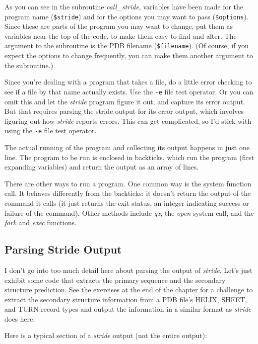 As you can see in the subroutine \textit{call\_stride}, variables have been made for the program name (\verb|$stride|) and for the options you may want to pass (\verb|$options|). Since these are parts of the program you may want to change, put them as variables near the top of the code, to make them easy to find and alter. The argument to the subroutine is the PDB filename (\verb|$filename|). (Of course, if you expect the options to change frequently, you can make them another argument to the subroutine.)

Since you're dealing with a program that takes a file, do a little error checking to see if a file by that name actually exists. Use the \verb|-e| file test operator. Or you can omit this and let the \textit{stride} program figure it out, and capture its error output. But that requires parsing the stride output for its error output, which involves figuring out how \textit{stride} reports errors. This can get complicated, so I'd stick with using the \verb|-e| file test operator.

The actual running of the program and collecting its output happens in just one line. The program to be run is enclosed in backticks, which run the program (first expanding variables) and return the output as an array of lines.

There are other ways to run a program. One common way is the system function call. It behaves differently from the backticks: it doesn't return the output of the command it calls (it just returns the exit status, an integer indicating success or failure of the command). Other methods include \textit{qx}, the \textit{open} system call, and the \textit{fork} and \textit{exec} functions. 

\subsection{Parsing Stride Output}
I don't go into too much detail here about parsing the output of \textit{stride}. Let's just exhibit some code that extracts the primary sequence and the secondary structure prediction. See the exercises at the end of the chapter for a challenge to extract the secondary structure information from a PDB file's HELIX, SHEET, and TURN record types and output the information in a similar format as \textit{stride} does here.
  
Here is a typical section of a \textit{stride} output (not the entire output):

